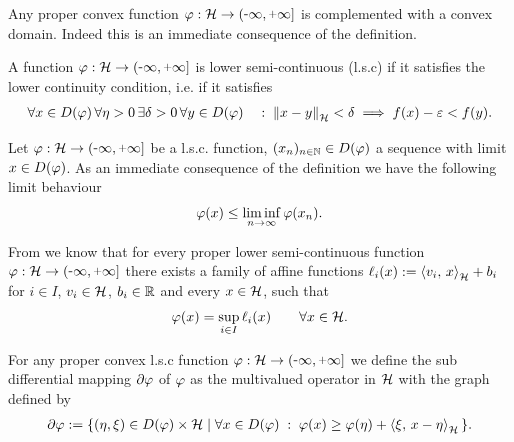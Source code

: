 \begin{remark}\label{remark:dom of prop conv fun is conv}
	Any proper convex function $ \varphi:\rH \ra \eRR $
	is complemented with a convex domain. Indeed this is an immediate
	consequence of the definition.
\end{remark}

\begin{definition}
	A function $ \varphi:\rH \ra \eRR $ is lower semi-continuous (l.s.c) if 
	it satisfies the lower continuity condition, i.e. if it satisfies
	\begin{align*}
		\forall x\in D(\varphi)\,
		\forall \eta>0\,
		\exists\delta>0\,
		\forall y\in D(\varphi)
		\quad :\;
		\left\Vert x-y\right\Vert_{\mathcal{H}}<\delta
		\implies 
		f(x)-\varepsilon<f(y).
	\end{align*}
\end{definition}

\begin{remark}\label{remark:lim inf prop lsc}
	Let $ \varphi:\rH \ra \eRR $ be a l.s.c. function, 
	$ (x_n)_{n\in\mathbb{N}}\in D(\varphi) $ a sequence with limit $ x\in D(\varphi) $.
	As an immediate consequence of the definition 
	we have the following limit behaviour 
	\begin{align*}
		\varphi(x)\leq \liminf_{n\rightarrow \infty}\varphi(x_n).
	\end{align*} 
\end{remark}

\begin{remark}\label{remark:prop lsc func is sup of aff}
	From \cite{rockafellar2015convex}
	we know that for every proper lower semi-continuous function 
	$ \vp:\rH\ra(\minus\infty,\plus\infty] $ 
	there exists a family of affine functions
	$ \ell_i(x):=\left\langle v_i,\,x\right\rangle_{\mathcal{H}}+b_i $ for
	$ i\in I $, $ v_i\in\mathcal{H} $, $ b_i\in\mathbb{R} $ and every 
	$ x\in\mathcal{H} $, such that 
	\begin{align*}
		\varphi(x)=\sup_{i\in I}\ell_i(x)
		\qquad\forall x\in\mathcal{H}.
	\end{align*}
\end{remark}

\begin{definition}
	For any proper convex l.s.c function $ \varphi:\rH \ra \eRR $ we
	define the sub differential mapping $ \partial\varphi $ of $ \varphi $
	as the multivalued operator in $ \mathcal{H} $ with the graph defined by
	\begin{align*}
		\partial\varphi:=\{(\eta,\xi)\in D(\varphi)\times\mathcal{H}
		\;\vert\; \forall x\in D(\varphi)\;:\;\varphi(x)\geq \varphi(\eta)+\left\langle \xi,\,x-\eta\right\rangle_{\mathcal{H}}\,\}.
	\end{align*}
\end{definition}

